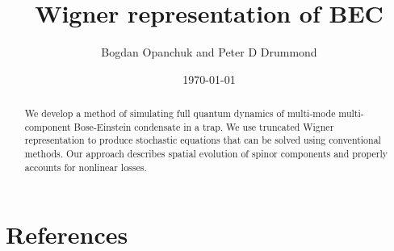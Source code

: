 \documentclass[12pt]{iopart}
\newcommand{\swinaffiliation}{Centre for Atom Optics and Ultrafast Spectroscopy, Swinburne University of Technology, Hawthorn, VIC 3122, Australia}
\begin{document}
\title{Wigner representation of BEC}

\author{Bogdan Opanchuk and Peter D Drummond}
\address{\swinaffiliation}

\date{\today}
\begin{abstract}
We develop a method of simulating full quantum dynamics of multi-mode multi-component Bose-Einstein condensate in a trap.
We use truncated Wigner representation to produce stochastic equations that can be solved using conventional methods.
Our approach describes spatial evolution of spinor components and properly accounts for nonlinear losses.
\end{abstract}





%







\appendix





\section*{References}

\end{document}
